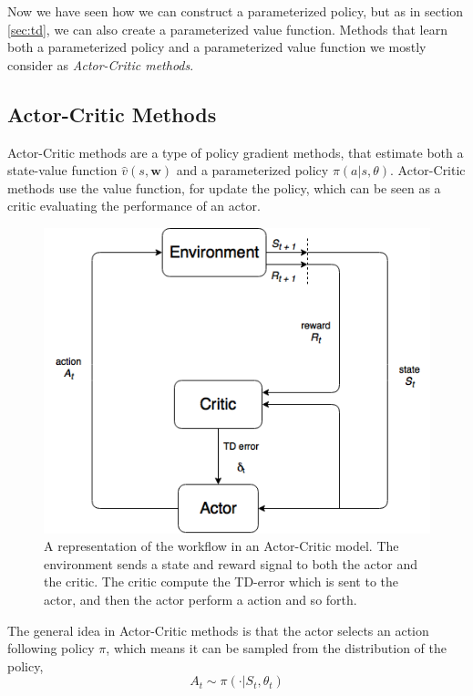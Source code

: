 \documentclass[11pt]{article}
\begin{document}
Now we have seen how we can construct a parameterized policy,
but as in section \ref{sec:td}, 
we can also create a parameterized value function. Methods that learn both a parameterized policy and a parameterized value function we mostly consider as \textit{Actor-Critic methods}.

\subsection{Actor-Critic Methods}

Actor-Critic methods are a type of policy gradient methods, that estimate both a state-value function $\hat{v}(s, \mathbf{w})$ and a parameterized policy $\pi(a | s, \theta)$. Actor-Critic methods use the value function, for update the policy, which can be seen as a critic evaluating the performance of an actor.

\begin{figure}[!h]
    \centering
    \includegraphics[scale = 0.5]{include/ActorCriticDiagram.png}
    \caption{A representation of the workflow in an Actor-Critic
    model. The environment sends a state and reward signal to both the actor and the critic. The critic compute the TD-error which is sent to the actor,
and then the actor perform a action and so forth.}
    \label{fig:actor-critic}
\end{figure}

The general idea in Actor-Critic methods is that the actor selects an action following policy $\pi$, which means it can be sampled from the distribution of the policy,
\begin{equation}
    A_{t} \sim \pi(\cdot | S_{t}, \theta_{t})
\end{equation}
\end{document}
